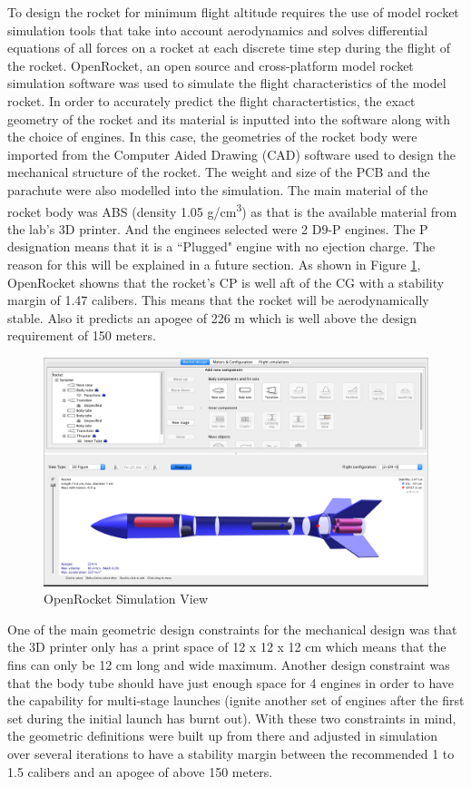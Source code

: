 \documentclass{workreport}
\begin{document}
\begin{body}
	To design the rocket for minimum flight altitude requires the use of model rocket simulation tools that take into account aerodynamics and solves differential equations of all forces on a rocket at each discrete time step during the flight of the rocket. OpenRocket, an open source and cross-platform model rocket simulation software was used to simulate the flight characteristics of the model rocket. In order to accurately predict the flight charactertistics, the exact geometry of the rocket and its material is inputted into the software along with the choice of engines. In this case, the geometries of the rocket body were imported from the Computer Aided Drawing (CAD) software used to design the mechanical structure of the rocket. The weight and size of the PCB and the parachute were also modelled into the simulation. The main material of the rocket body was ABS (density 1.05 g/cm\textsuperscript{3}) as that is the available material from the lab's 3D printer. And the enginees selected were 2 D9-P engines. The P designation means that it is a ``Plugged" engine with no ejection charge. The reason for this will be explained in a future section. As shown in Figure \ref{fig:openrocket}, OpenRocket showns that the rocket's CP is well aft of the CG with a stability margin of 1.47 calibers. This means that the rocket will be aerodynamically stable. Also it predicts an apogee of 226 m which is well above the design requirement of 150 meters.

	\begin{figure}[!ht]
		\centering
		\includegraphics[width=14cm]{./images/openrocket.png}
		\caption{OpenRocket Simulation View}
		\label{fig:openrocket}
	\end{figure}

	One of the main geometric design constraints for the mechanical design was that the 3D printer only has a print space of 12 x 12 x 12 cm which means that the fins can only be 12 cm long and wide maximum. Another design constraint was that the body tube should have just enough space for 4 engines in order to have the capability for multi-stage launches (ignite another set of engines after the first set during the initial launch has burnt out). With these two constraints in mind, the geometric definitions were built up from there and adjusted in simulation over several iterations to have a stability margin between the recommended 1 to 1.5 calibers and an apogee of above 150 meters.


\end{body}
\end{document}
